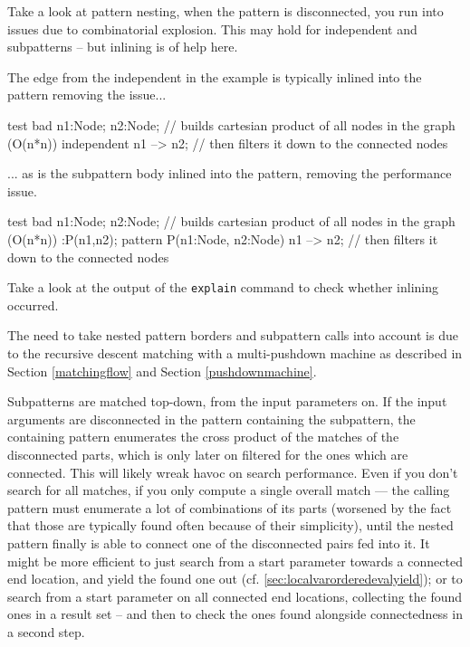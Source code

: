 \begin{example}
Take a look at pattern nesting, when the pattern is disconnected, you run into issues due to combinatorial explosion.
This may hold for independent and subpatterns -- but inlining is of help here.

The edge from the independent in the example is typically inlined into the pattern removing the issue...
\begin{grgen}
test bad {
  n1:Node; n2:Node; // builds cartesian product of all nodes in the graph (O(n*n))
  independent {
    n1 --> n2; // then filters it down to the connected nodes
  }
}
\end{grgen}
... as is the subpattern body inlined into the pattern, removing the performance issue.
\begin{grgen}
test bad {
  n1:Node; n2:Node; // builds cartesian product of all nodes in the graph (O(n*n))
  :P(n1,n2);
}
pattern P(n1:Node, n2:Node) {
  n1 --> n2; // then filters it down to the connected nodes
}
\end{grgen}
Take a look at the output of the \texttt{explain} command to check whether inlining occurred.
\end{example}

The need to take nested pattern borders and subpattern calls into account is due to the recursive descent matching with a multi-pushdown machine as described in Section \ref{matchingflow} and Section \ref{pushdownmachine}.

Subpatterns are matched top-down, from the input parameters on.
If the input arguments are disconnected in the pattern containing the subpattern, the containing pattern enumerates the cross product of the matches of the disconnected parts, which is only later on filtered for the ones which are connected.
This will likely wreak havoc on search performance.
Even if you don't search for all matches, if you only compute a single overall match --- the calling pattern must enumerate a lot of combinations of its parts (worsened by the fact that those are typically found often because of their simplicity), until the nested pattern finally is able to connect one of the disconnected pairs fed into it.
It might be more efficient to just search from a start parameter towards a connected end location, and yield the found one out (cf. \ref{sec:localvarorderedevalyield}); or to search from a start parameter on all connected end locations, collecting the found ones in a result set -- and then to check the ones found alongside connectedness in a second step.

